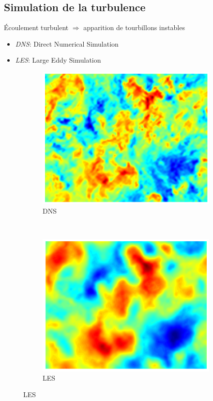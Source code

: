 \documentclass{beamer}
\begin{document}
\subsection{Simulation de la turbulence}
\begin{frame}
  Écoulement turbulent $\Rightarrow$ apparition de tourbillons instables
  \begin{itemize}
  \item \textit{DNS}: Direct Numerical Simulation
  \item \textit{LES}: Large Eddy Simulation
  \end{itemize}

  \begin{figure}[ht]
    \centering
    \begin{subfigure}[b]{0.5\textwidth}
      \centering
      \includegraphics[scale=0.25]{figures/DNS_Velocity_Field.png}
      \caption{\label{fig:dns} DNS}
    \end{subfigure}%
    ~
    \begin{subfigure}[b]{0.5\textwidth}
      \centering
      \includegraphics[scale=0.25]{figures/DNS_Filtered_Velocity_Field_Large.png}
      \caption{\label{fig:les} LES}
    \end{subfigure}
  \end{figure}
\end{frame}
\end{document}

